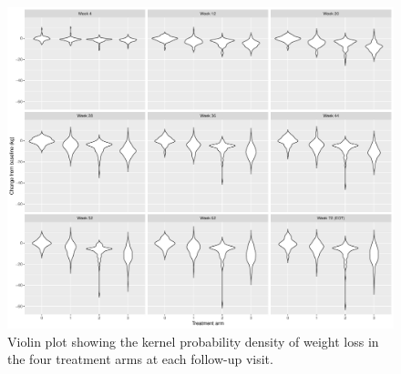 \documentclass[AMA,STIX1COL]{WileyNJD-v2}
\begin{document}
\begin{figure}[h]
    \centering
    \includegraphics[scale=.55]{violinplot_kg.pdf}
    \caption{Violin plot showing the kernel probability density of weight loss in the four treatment arms at each follow-up visit.}
    \label{fig:my_label}
\end{figure}




\nocite{*}%
%

\clearpage
\end{document}
